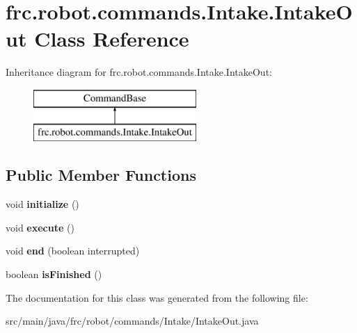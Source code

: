 \hypertarget{classfrc_1_1robot_1_1commands_1_1_intake_1_1_intake_out}{}\section{frc.\+robot.\+commands.\+Intake.\+Intake\+Out Class Reference}
\label{classfrc_1_1robot_1_1commands_1_1_intake_1_1_intake_out}
Inheritance diagram for frc.\+robot.\+commands.\+Intake.\+Intake\+Out\+:\begin{figure}[H]
\begin{center}
\leavevmode
\includegraphics[height=2.000000cm]{classfrc_1_1robot_1_1commands_1_1_intake_1_1_intake_out}
\end{center}
\end{figure}
\subsection*{Public Member Functions}
\begin{DoxyCompactItemize}
\item 
\mbox{\label{classfrc_1_1robot_1_1commands_1_1_intake_1_1_intake_out_a714af0c6f2d79367632f67cebd3fd17f}} 
void {\bfseries initialize} ()
\item 
\mbox{\label{classfrc_1_1robot_1_1commands_1_1_intake_1_1_intake_out_aa9ded28d9f54ca12d6c0f7734df89729}} 
void {\bfseries execute} ()
\item 
\mbox{\label{classfrc_1_1robot_1_1commands_1_1_intake_1_1_intake_out_a7cd5451abfe868d12b84510da2710a0d}} 
void {\bfseries end} (boolean interrupted)
\item 
\mbox{\label{classfrc_1_1robot_1_1commands_1_1_intake_1_1_intake_out_adac95461c289512f6327b8561443ae1b}} 
boolean {\bfseries is\+Finished} ()
\end{DoxyCompactItemize}


The documentation for this class was generated from the following file\+:\begin{DoxyCompactItemize}
\item 
src/main/java/frc/robot/commands/\+Intake/Intake\+Out.\+java\end{DoxyCompactItemize}
